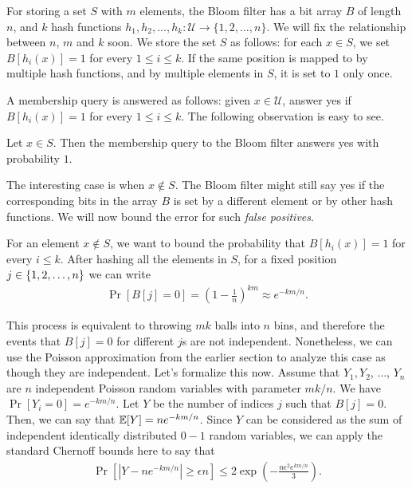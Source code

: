 For storing a set $S$ with $m$ elements, the Bloom filter has a bit array $B$ of
length $n$, and $k$ hash functions
$h_1,h_2,\ldots,h_k: \mathcal{U} \to \{1,2,\ldots,n\}$. We will fix the
relationship between $n$, $m$ and $k$ soon. We store the set $S$ as follows: for
each $x\in S$, we set $B[h_i(x)] = 1$ for every $1\leq i\leq k$. If the same
position is mapped to by multiple hash functions, and by multiple elements in
$S$, it is set to $1$ only once.

A membership query is answered as follows: given $x\in \mathcal{U}$, answer yes
if $B[h_i(x)]=1$ for every $1 \leq i\leq k$. The following observation is easy
to see.

\begin{proposition}
  Let $x\in S$. Then the membership query to the Bloom filter answers yes with probability $1$.
  \label{prop:bf-positives}
\end{proposition}

The interesting case is when $x\notin S$. The Bloom filter might still say yes
if the corresponding bits in the array $B$ is set by a different element or by
other hash functions. We will now bound the error for such \emph{false
  positives}.

For an element $x\notin S$, we want to bound the probability that
$B[h_i(x)] = 1$ for every $i \leq k$. After hashing all the elements in $S$, for a fixed position $j\in \{1,2,\ldots,n\}$ we can write
\begin{align*}
  \Pr[B[j] = 0] = \left(1 - \frac{1}{n} \right)^{km} \approx e^{-km/n}.
\end{align*}

This process is equivalent to throwing $mk$ balls into $n$ bins, and therefore
the events that $B[j]=0$ for different $j$s are not independent. Nonetheless, we
can use the Poisson approximation from the earlier section to analyze this case
as though they are independent. Let's formalize this now. Assume that
$Y_1, Y_2$, $\ldots$, $Y_n$ are $n$ independent Poisson random variables with
parameter $mk/n$. We have $\Pr[Y_i = 0] = e^{-km/n}$. Let $Y$ be the number of
indices $j$ such that $B[j] = 0$. Then, we can say that $\mathbb{E}[Y] = ne^{-km/n}$.
Since $Y$ can be considered as the sum of independent identically distributed
$0-1$ random variables, we can apply the standard Chernoff bounds here to say
that
\begin{align*}
  \Pr[ |Y - ne^{-km/n}| \geq \epsilon n ] \leq 2\exp\left(-\frac{n\epsilon^2e^{km/n}}{3} \right).
\end{align*}

